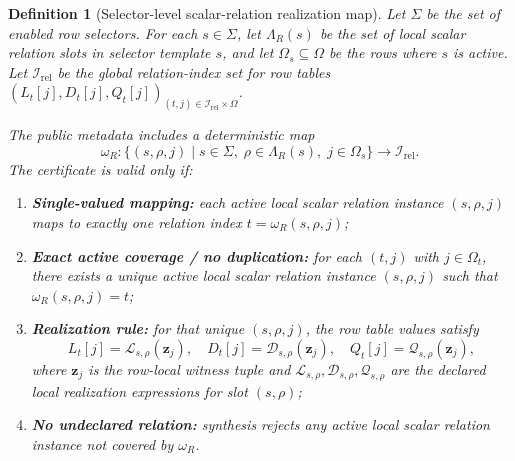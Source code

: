 ﻿\documentclass[11pt]{article}
\newtheorem{definition}[theorem]{Definition}
\begin{document}
\begin{definition}[Selector-level scalar-relation realization map]
\label{def:selector-relation-realization}
Let \(\Sigma\) be the set of enabled row selectors. For each \(s\in\Sigma\),
let \(\Lambda_R(s)\) be the set of local scalar relation slots in selector
template \(s\), and let \(\Omega_s\subseteq\Omega\) be the rows where \(s\) is
active. Let \(\mathcal I_{\mathrm{rel}}\) be the global relation-index set for
row tables \((L_t[j],D_t[j],Q_t[j])_{(t,j)\in\mathcal I_{\mathrm{rel}}\times\Omega}\).

The public metadata includes a deterministic map
\[
\omega_R:
\{(s,\rho,j)\mid s\in\Sigma,\;\rho\in\Lambda_R(s),\;j\in\Omega_s\}
\to
\mathcal I_{\mathrm{rel}}.
\]
The certificate is valid only if:
\begin{enumerate}[label=(\roman*),leftmargin=2em]
    \item \textbf{Single-valued mapping:} each active local scalar relation instance
    \((s,\rho,j)\) maps to exactly one relation index
    \(t=\omega_R(s,\rho,j)\);
    \item \textbf{Exact active coverage / no duplication:} for each
    \((t,j)\) with \(j\in\Omega_t\), there exists a unique active local scalar
    relation instance \((s,\rho,j)\) such that \(\omega_R(s,\rho,j)=t\);
    \item \textbf{Realization rule:} for that unique \((s,\rho,j)\), the row
    table values satisfy
    \[
    L_t[j]=\mathcal L_{s,\rho}(\mathbf z_j),\quad
    D_t[j]=\mathcal D_{s,\rho}(\mathbf z_j),\quad
    Q_t[j]=\mathcal Q_{s,\rho}(\mathbf z_j),
    \]
    where \(\mathbf z_j\) is the row-local witness tuple and
    \(\mathcal L_{s,\rho},\mathcal D_{s,\rho},\mathcal Q_{s,\rho}\) are the
    declared local realization expressions for slot \((s,\rho)\);
    \item \textbf{No undeclared relation:} synthesis rejects any active local
    scalar relation instance not covered by \(\omega_R\).
\end{enumerate}
\end{definition}
\end{document}
